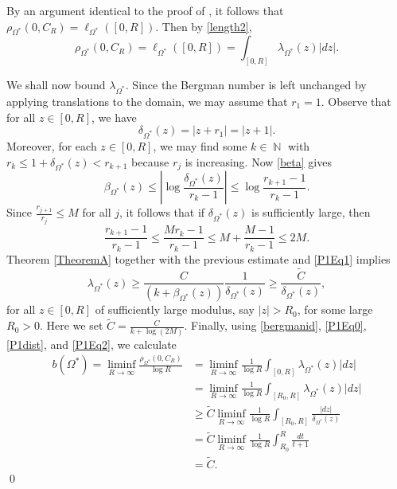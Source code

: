 \documentclass[11pt, letterpaper,leqno]{amsart}
\numberwithin{equation}{section}
\theoremstyle{definition}
\DeclareMathOperator{\N}{\mathbb{N}}
\begin{document}
By an argument identical to the proof of \cite[Lemma 4.4]{CZ}, it follows that $\rho_{\Omega^*}(0,C_R)=\ell_{\Omega^*}\left([0,R]\right)$. Then by \eqref{length2},
\begin{equation}\label{P1Eq0}
	\rho_{\Omega^*}(0,C_R)=\ell_{\Omega^*}\left([0,R]\right)=\int_{[0,R]}\lambda_{\Omega^*}(z)|dz|.
\end{equation}

We shall now bound $\lambda_{\Omega^*}$. Since the Bergman number is left unchanged by applying translations to the domain, we may assume that $r_1=1$. Observe that for all $z\in [0,R]$, we have
\begin{equation}\label{P1dist}
\delta_{\Omega^*}(z)=|z+r_1|=|z+1|.
\end{equation}
Moreover, for each $z\in[0,R]$, we may find some $k\in\N$ with $r_k\leq 1+\delta_{\Omega^*}(z)<r_{k+1}$ because $r_j$ is increasing. Now \eqref{beta} gives
\begin{equation}\label{P1Eq1}
\beta_{\Omega^*}(z)\leq \left\lvert \log \frac{\delta_{\Omega^*}(z)}{r_k-1}\right\rvert\leq \log\frac{r_{k+1}-1}{r_k-1}.
\end{equation}
Since $\frac{r_{j+1}}{r_j}\leq M$ for all $j$, it follows that if $\delta_{\Omega^*}(z)$ is sufficiently large, then 
\[
\frac{r_{k+1}-1}{r_k-1}\leq \frac{Mr_k-1}{r_k-1}\leq M+\frac{M-1}{r_k-1}\leq 2M.
\]
Theorem \ref{TheoremA} together with the previous estimate and \eqref{P1Eq1} implies
\begin{equation}\label{P1Eq2}
\lambda_{\Omega^*}(z)\geq \frac{C}{(k+\beta_{\Omega^*}(z))}\frac{1}{\delta_{\Omega^*}(z)}\geq \frac{\tilde{C}}{\delta_{\Omega^*}(z)},
\end{equation}
for all $z\in [0,R]$ of sufficiently large modulus, say $|z|>R_0$, for some large $R_0>0$. Here we set $\tilde{C}=\frac{C}{k+\log (2M)}$.
Finally, using \eqref{bergmanid}, \eqref{P1Eq0}, \eqref{P1dist}, and \eqref{P1Eq2}, we calculate
\begin{align*}
b(\Omega^*)=\liminf_{R\to\infty}\frac{\rho_{\Omega^*}(0,C_R)}{\log R} &=
\liminf_{R\to\infty}\frac{1}{\log R}\int_{[0,R]}\lambda_{\Omega^*}(z)|dz|\\
&=\liminf_{R\to\infty}\frac{1}{\log R}\int_{[R_0,R]}\lambda_{\Omega^*}(z)|dz| \\
&\geq \tilde{C}\liminf_{R\to\infty}\frac{1}{\log R}\int_{[R_0,R]}\frac{|dz|}{\delta_{\Omega^*}(z)}\\
&= \tilde{C}\liminf_{R\to\infty}\frac{1}{\log R}\int_{R_0}^{R}\frac{dt}{t+1}\\
&= \tilde{C}.
\end{align*}
\qed
\end{document}
